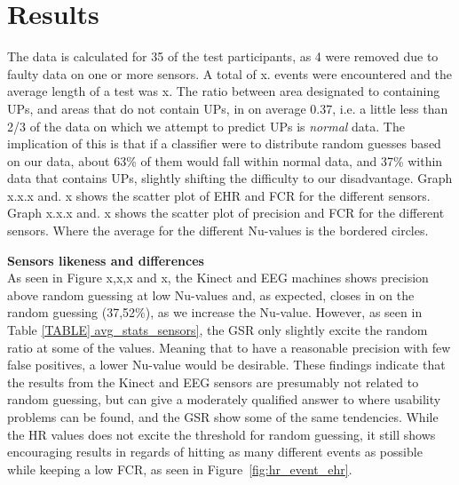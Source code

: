 \section{Results}
The data is calculated for 35 of the test participants, as 4 were removed due to faulty data on one or more sensors.	
A total of x. events were encountered and the average length of a test was x.
The ratio between area designated to containing UPs, and areas that do not contain UPs, in on average 0.37, i.e. a
little less than 2/3 of the data on which we attempt to predict UPs is \textit{normal} data. The implication of this is
that if a classifier were to distribute random guesses based on our data, about 63\% of them would fall within normal
data, and 37\% within data that contains UPs, slightly shifting the difficulty to our disadvantage.
Graph x.x.x and. x shows the scatter plot of EHR and FCR for the different sensors. 
Graph x.x.x and. x shows the scatter plot of precision and FCR for the different sensors. Where the average for the different Nu-values is the bordered circles.



\textbf{Sensors likeness and differences}\\
As seen in Figure x,x,x and x, the Kinect and EEG machines shows precision above random guessing at low Nu-values and,
as expected, closes in on the random guessing (37,52\%), as we increase the Nu-value. However, as seen in Table
\ref{TABLE] avg_stats_sensors}, the GSR only slightly excite the random ratio at some of the values. Meaning that
to have a reasonable precision with few false positives, a lower Nu-value would be desirable.
These findings indicate that the results from the Kinect and EEG sensors are presumably not related to random guessing, but can give a moderately qualified answer to where usability problems can be found, and the GSR show some of the same tendencies.
While the HR values does not excite the threshold for random guessing, it still shows encouraging results in regards of hitting as many different events as possible while keeping a low FCR, as seen in Figure~\ref{fig:hr_event_ehr}.




